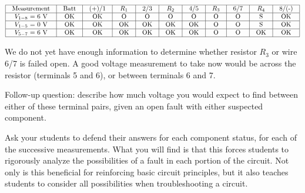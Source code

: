 






$$\vbox{\offinterlineskip
\halign{\strut
\vrule \quad\hfil # \ \hfil & 
\vrule \quad\hfil # \ \hfil & 
\vrule \quad\hfil # \ \hfil & 
\vrule \quad\hfil # \ \hfil & 
\vrule \quad\hfil # \ \hfil & 
\vrule \quad\hfil # \ \hfil & 
\vrule \quad\hfil # \ \hfil & 
\vrule \quad\hfil # \ \hfil & 
\vrule \quad\hfil # \ \hfil & 
\vrule \quad\hfil # \ \hfil & 
\vrule \quad\hfil # \ \hfil \vrule \cr
\noalign{\hrule}
%
Measurement & Batt & (+)/1 & $R_1$ & 2/3 & $R_2$ & 4/5 & $R_3$ & 6/7 & $R_4$ & 8/(-) \cr
%
\noalign{\hrule}
%
$V_{1-8}$ = 6 V  & OK & OK & O & O & O & O & O & O & S & OK \cr
%
\noalign{\hrule}
%
$V_{1-5}$ = 0 V  & OK & OK & OK & OK & OK & OK & O & O & S & OK \cr
%
\noalign{\hrule}
%
$V_{5-7}$ = 6 V  & OK & OK & OK & OK & OK & OK & O & O & OK & OK \cr
%
\noalign{\hrule}
} %
}$$ %

We do not yet have enough information to determine whether resistor $R_3$ or wire 6/7 is failed open.  A good voltage measurement to take now would be across the resistor (terminals 5 and 6), or between terminals 6 and 7.

\vskip 10pt

Follow-up question: describe how much voltage you would expect to find between either of these terminal pairs, given an open fault with either suspected component.







Ask your students to defend their answers for each component status, for each of the successive measurements.  What you will find is that this forces students to rigorously analyze the possibilities of a fault in each portion of the circuit.  Not only is this beneficial for reinforcing basic circuit principles, but it also teaches students to consider all possibilities when troubleshooting a circuit.




